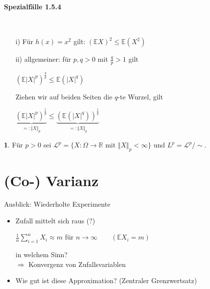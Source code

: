 \documentclass[10pt,a4paper]{report}
\numberwithin{equation}{section}
\numberwithin{figure}{section}
\theoremstyle{plain}
\theoremstyle{definition}
\newtheorem{defn}[thm]{\protect\definitionname}
\theoremstyle{remark}
\theoremstyle{plain}
\providecommand{\definitionname}{Definition}
\newcommand{\1}{ \mathbb{1} } %
\begin{document}
\paragraph{Spezialfälle 1.5.4} \ 
\begin{itemize}
\item[i)] Für $h(x)=x^2$ gilt: $(\mathbb{E}X)^2\leq \mathbb{E}(X^2)$
\item[ii)] allgemeiner: für $p,q>0$ mit $\frac{q}{p}>1$ gilt
  \begin{center}
    $(\mathbb{E}|X|^p)^\frac{q}{p} \leq \mathbb{E}(|X|^q)$
  \end{center} 
  Ziehen wir auf beiden Seiten die $q$-te Wurzel, gilt
  \begin{center}
    $\underbrace{(\mathbb{E}|X|^p)^\frac{1}{p}}_{=:\Vert X\Vert_p}\leq\underbrace{(\mathbb{E}(|X|^q))^\frac{1}{q}}_{=:\Vert X\Vert_q}$ 
  \end{center}
\end{itemize}
\begin{defn} 
  Für $p>0$ sei $\mathcal{L}^p=\{X:\Omega \to \mathbb{R}$ mit $\Vert X\Vert_p<\infty\}$ und $L^p=\mathcal{L}^p/\sim$.
\end{defn}

\section{(Co-) Varianz}
\label{sec:varianz}

Ausblick: Wiederholte Experimente
\begin{itemize}
\item Zufall mittelt sich raus (?)
  \begin{center}
    $\frac{1}{n}\sum\limits_{i=1}^nX_i\approx m$ für $ n\to \infty
    \qquad (\mathbb{E}X_i=m)$
  \end{center}
  in welchem Sinn?\\
  $\Rightarrow$ Konvergenz von Zufallsvariablen
\item Wie gut ist diese Approximation? (Zentraler Grenzwertsatz)
\end{itemize}
\end{document}
